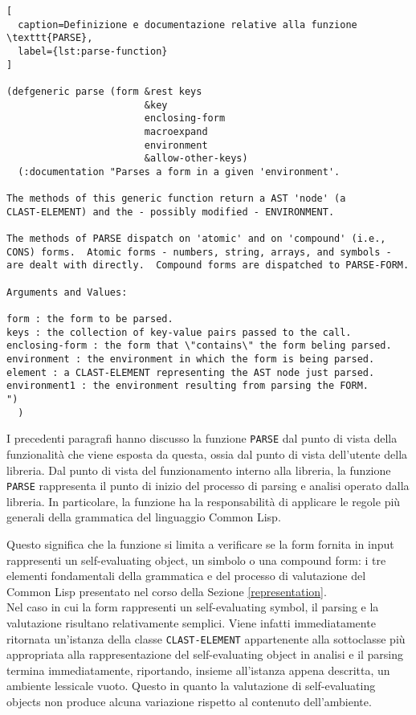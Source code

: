 \begin{lstlisting}[
  caption=Definizione e documentazione relative alla funzione \texttt{PARSE},
  label={lst:parse-function}
]

(defgeneric parse (form &rest keys
                        &key
                        enclosing-form
                        macroexpand
                        environment
                        &allow-other-keys)
  (:documentation "Parses a form in a given 'environment'.

The methods of this generic function return a AST 'node' (a
CLAST-ELEMENT) and the - possibly modified - ENVIRONMENT.

The methods of PARSE dispatch on 'atomic' and on 'compound' (i.e.,
CONS) forms.  Atomic forms - numbers, string, arrays, and symbols -
are dealt with directly.  Compound forms are dispatched to PARSE-FORM.

Arguments and Values:

form : the form to be parsed.
keys : the collection of key-value pairs passed to the call.
enclosing-form : the form that \"contains\" the form beling parsed.
environment : the environment in which the form is being parsed.
element : a CLAST-ELEMENT representing the AST node just parsed.
environment1 : the environment resulting from parsing the FORM.
")
  )

\end{lstlisting}

I precedenti paragrafi hanno discusso la funzione \texttt{PARSE} dal punto di
vista della funzionalità che viene esposta da questa, ossia dal punto di vista
dell'utente della libreria. Dal punto di vista del funzionamento interno alla
libreria, la funzione \texttt{PARSE} rappresenta il punto di inizio del processo
di parsing e analisi operato dalla libreria. In particolare, la funzione ha la
responsabilità di applicare le regole più generali della grammatica del
linguaggio Common Lisp.

Questo significa che la funzione si limita a verificare se la form fornita in
input rappresenti un self-evaluating object, un simbolo o una compound form: i
tre elementi fondamentali della grammatica e del processo di valutazione del
Common Lisp presentato nel corso della Sezione \ref{representation}.\\

Nel caso in cui la form rappresenti un self-evaluating symbol, il parsing e la
valutazione risultano relativamente semplici. Viene infatti immediatamente
ritornata un’istanza della classe \texttt{CLAST-ELEMENT} appartenente alla
sottoclasse più appropriata alla rappresentazione del self-evaluating object in
analisi e il parsing termina immediatamente, riportando, insieme all’istanza
appena descritta, un ambiente lessicale vuoto. Questo in quanto la valutazione
di self-evaluating objects non produce alcuna variazione rispetto al contenuto
dell'ambiente.\\

